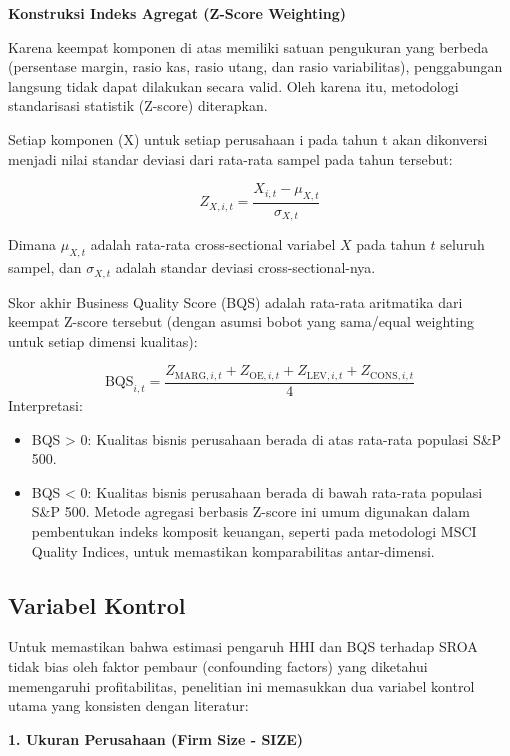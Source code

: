 \documentclass[12pt,a4paper]{report}
\providecommand{\tightlist}{%
  \setlength{\itemsep}{0pt}\setlength{\parskip}{0pt}%
}
\begin{document}
\textbf{Konstruksi Indeks Agregat (Z-Score Weighting)}

Karena keempat komponen di atas memiliki satuan pengukuran yang berbeda
(persentase margin, rasio kas, rasio utang, dan rasio variabilitas),
penggabungan langsung tidak dapat dilakukan secara valid. Oleh karena
itu, metodologi standarisasi statistik (Z-score) diterapkan.

Setiap komponen (X) untuk setiap perusahaan i pada tahun t akan
dikonversi menjadi nilai standar deviasi dari rata-rata sampel pada
tahun tersebut:

\[
Z_{X,i,t} = \frac{X_{i,t} - \mu_{X,t}}{\sigma_{X,t}}
\]

Dimana \(\mu_{X,t}\) adalah rata-rata cross-sectional variabel \(X\)
pada tahun \(t\) seluruh sampel, dan \(\sigma_{X,t}\) adalah standar
deviasi cross-sectional-nya.

Skor akhir Business Quality Score (BQS) adalah rata-rata aritmatika dari
keempat Z-score tersebut (dengan asumsi bobot yang sama/equal weighting
untuk setiap dimensi kualitas):

\[
\mathrm{BQS}_{i,t} = \frac{Z_{\mathrm{MARG},i,t} + Z_{\mathrm{OE},i,t} + Z_{\mathrm{LEV},i,t} + Z_{\mathrm{CONS},i,t}}{4}
\] Interpretasi:

\begin{itemize}
\tightlist
\item
  BQS \textgreater{} 0: Kualitas bisnis perusahaan berada di atas
  rata-rata populasi S\&P 500.
\item
  BQS \textless{} 0: Kualitas bisnis perusahaan berada di bawah
  rata-rata populasi S\&P 500. Metode agregasi berbasis Z-score ini umum
  digunakan dalam pembentukan indeks komposit keuangan, seperti pada
  metodologi MSCI Quality Indices, untuk memastikan komparabilitas
  antar-dimensi.
\end{itemize}

\hypertarget{variabel-kontrol}{%
\subsection{Variabel Kontrol}\label{variabel-kontrol}}

Untuk memastikan bahwa estimasi pengaruh HHI dan BQS terhadap SROA tidak
bias oleh faktor pembaur (confounding factors) yang diketahui
memengaruhi profitabilitas, penelitian ini memasukkan dua variabel
kontrol utama yang konsisten dengan literatur:

\textbf{1. Ukuran Perusahaan (Firm Size - SIZE)}
\end{document}
